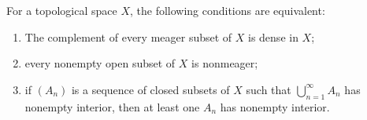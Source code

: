 For a topological space $X$, the following conditions are equivalent:
\begin{enumerate}
\item[(a)] The complement of every meager subset of $X$ is dense in $X$;
\item[(b)] every nonempty open subset of $X$ is nonmeager;
\item[(c)] if $(A_n)$ is a sequence of closed subsets of $X$ such that $\bigcup_{n=1}^{\infty} A_n$ has nonempty interior, then at least one $A_n$ has nonempty interior.
\end{enumerate}
